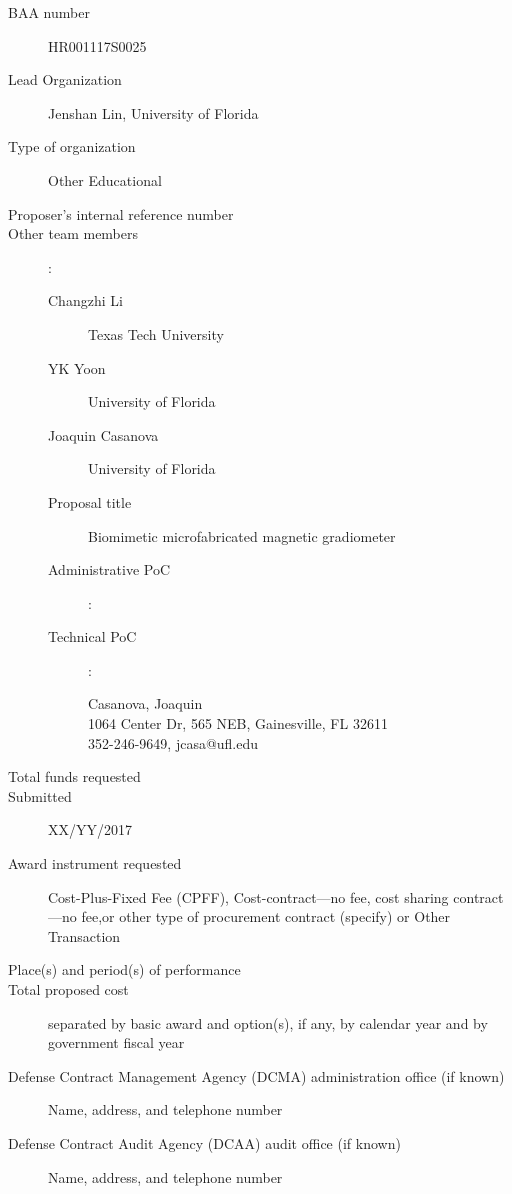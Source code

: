 
\begin{description}
\item [BAA number] HR001117S0025
\item [Lead Organization] Jenshan Lin, University of Florida
\item [Type of organization] Other Educational
\item [Proposer’s internal reference number]
\item [Other team members]:
  \begin{description}
  \item [Changzhi Li] Texas Tech University
  \item [YK Yoon] University of Florida 
  \item [Joaquin Casanova] University of Florida 
  \item [Proposal title] Biomimetic microfabricated magnetic gradiometer
  \item [Administrative PoC]:
    \begin{description}
    \item []
    \item []
    \item []
    \end{description}
  \item [Technical PoC]:
    \begin{description}
    \item [Casanova, Joaquin]
    \item [1064 Center Dr, 565 NEB, Gainesville, FL 32611]
    \item [352-246-9649, jcasa@ufl.edu]
    \end{description}
  \end{description}
\item [Total funds requested]
\item [Submitted] XX/YY/2017
\item [Award instrument requested] Cost-Plus-Fixed Fee (CPFF), Cost-contract—no fee, cost sharing contract—no fee,or other type of procurement contract (specify) or Other Transaction
\item [Place(s) and period(s) of performance]
\item [Total proposed cost] separated by basic award and option(s), if any, by calendar year
and by government fiscal year
\item [Defense Contract Management Agency (DCMA) administration office (if known)] Name, address, and telephone number
\item [Defense Contract Audit Agency (DCAA) audit office (if known)] Name, address, and telephone number

\end{description}
